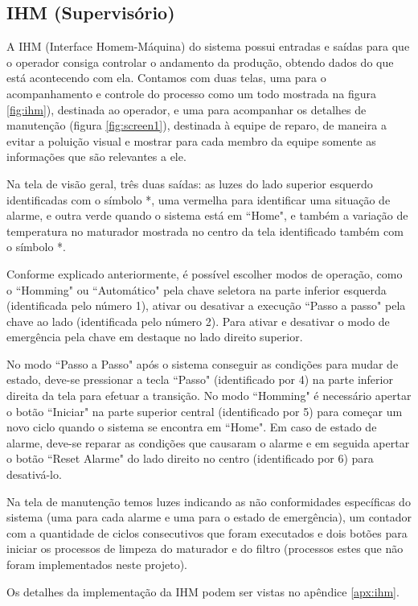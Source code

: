 \documentclass[twoside,twocolumn, 12pt]{paper}
\begin{document}
	\subsection{IHM (Supervisório)}
	A IHM (Interface Homem-Máquina) do sistema possui entradas e saídas para que o operador consiga controlar o andamento da produção, obtendo dados do que está acontecendo com ela. Contamos com duas telas, uma para o acompanhamento e controle do processo como um todo mostrada na figura \ref{fig:ihm}), destinada ao operador, e uma para acompanhar os detalhes de manutenção (figura \ref{fig:screen1}), destinada à equipe de reparo, de maneira a evitar a poluição visual e mostrar para cada membro da equipe somente as informações que são relevantes a ele.
	
	Na tela de visão geral, três duas saídas: as luzes do lado superior esquerdo identificadas com o símbolo *, uma vermelha para identificar uma situação de alarme, e outra verde quando o sistema está em ``Home", e também a variação de temperatura no maturador mostrada no centro da tela identificado também com o símbolo *.
	
	Conforme explicado anteriormente, é possível escolher modos de operação, como o ``Homming" ou ``Automático" pela chave seletora na parte inferior esquerda (identificada pelo número 1), ativar ou desativar a execução ``Passo a passo" pela chave ao lado (identificada pelo número 2).	Para ativar e desativar o modo de emergência pela chave em destaque no lado direito superior.
	
	No modo ``Passo a Passo" após o sistema conseguir as condições para mudar de estado, deve-se pressionar a tecla ``Passo" (identificado por 4) na parte inferior direita da tela para efetuar a transição. No modo ``Homming" é necessário apertar o botão ``Iniciar" na parte superior central (identificado por 5) para começar um novo ciclo quando o sistema se encontra em ``Home". Em caso de estado de alarme, deve-se reparar as condições que causaram o alarme e em seguida apertar o botão ``Reset Alarme" do lado direito no centro (identificado por 6) para desativá-lo.
	
	Na tela de manutenção temos luzes indicando as não conformidades específicas do sistema (uma para cada alarme e uma para o estado de emergência), um contador com a quantidade de ciclos consecutivos que foram executados e dois botões para iniciar os processos de limpeza do maturador e do filtro (processos estes que não foram implementados neste projeto).
	
	Os detalhes da implementação da IHM podem ser vistas no apêndice \ref{apx:ihm}.
	
\end{document}
